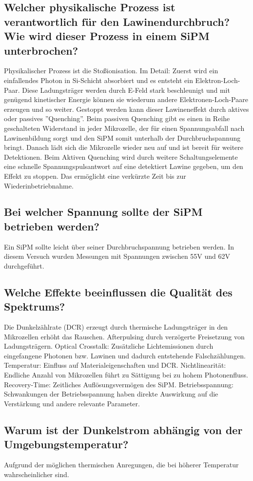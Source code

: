 \documentclass[12pt]{article}
\begin{document}
\subsection{Welcher physikalische Prozess ist verantwortlich für den Lawinendurchbruch? Wie wird dieser Prozess in einem SiPM unterbrochen?}
Physikalischer Prozess ist die Stoßionisation.
Im Detail: Zuerst wird ein einfallendes Photon in Si-Schicht absorbiert und es entsteht ein Elektron-Loch-Paar.
Diese Ladungsträger werden durch E-Feld stark beschleunigt und mit genügend kinetischer Energie können sie wiederum andere Elektronen-Loch-Paare erzeugen und so weiter.
Gestoppt werden kann dieser Lawineneffekt durch aktives oder passives ''Quenching''.
Beim passiven Quenching gibt es einen in Reihe geschalteten Widerstand in jeder Mikrozelle, der für einen Spannungsabfall nach Lawinenbildung sorgt und den SiPM somit unterhalb der Durchbruchspannung bringt.
Danach lädt sich die Mikrozelle wieder neu auf und ist bereit für weitere Detektionen.
Beim Aktiven Quenching wird durch weitere Schaltungselemente eine schnelle Spannungspulsantwort auf eine detektiert Lawine gegeben, um den Effekt zu stoppen.
Das ermöglicht eine verkürzte Zeit bis zur Wiederinbetriebnahme.
\subsection{Bei welcher Spannung sollte der SiPM betrieben werden?}
Ein SiPM sollte leicht über seiner Durchbruchspannung betrieben werden.
In diesem Versuch wurden Messungen mit Spannungen zwischen 55V und 62V durchgeführt.

\subsection{Welche Effekte beeinflussen die Qualität des Spektrums?}
Die Dunkelzählrate (DCR) erzeugt durch thermische Ladungsträger in den Mikrozellen erhöht das Rauschen.
Afterpulsing durch verzögerte Freisetzung von Ladungsträgern.
Optical Crosstalk: Zusätzliche Lichtemissionen durch eingefangene Photonen bzw. Lawinen und dadurch entstehende Falschzählungen.
Temperatur: Einfluss auf Materialeigenschaften und DCR\@.
Nichtlinearität: Endliche Anzahl von Mikrozellen führt zu Sättigung bei zu hohem Photonenfluss.
Recovery-Time: Zeitliches Auflösungsvermögen des SiPM\@.
Betriebsspannung: Schwankungen der Betriebsspannung haben direkte Auswirkung auf die Verstärkung und andere relevante Parameter.

\subsection{Warum ist der Dunkelstrom abhängig von der Umgebungstemperatur?}
Aufgrund der möglichen thermischen Anregungen, die bei höherer Temperatur wahrscheinlicher sind.
\end{document}
